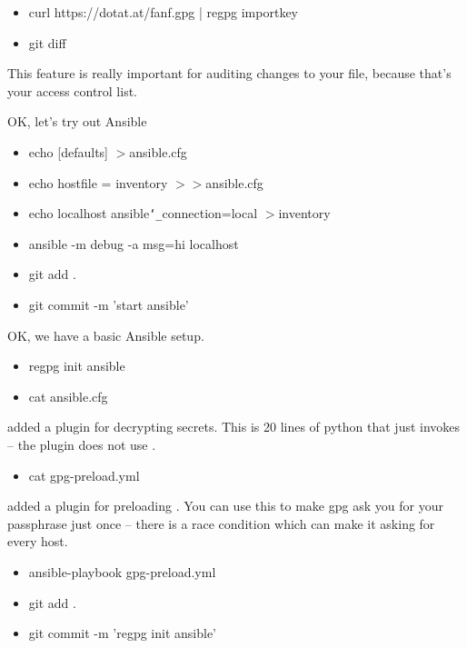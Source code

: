 {  \begin{itemize}
  \item curl https://dotat.at/fanf.gpg | regpg importkey
  \item git diff
  \end{itemize}

  This feature is really important for auditing changes to your
   file, because that's your access control list.

  OK, let's try out Ansible

  \begin{itemize}
  \item echo [defaults] $>$ansible.cfg
  \item echo hostfile = inventory $>>$ansible.cfg
  \item echo localhost ansible\texttt{\char`_}connection=local $>$inventory
  \item ansible -m debug -a msg=hi localhost
  \item git add .
  \item git commit -m 'start ansible'
  \end{itemize}

  OK, we have a basic Ansible setup.

  \begin{itemize}
  \item regpg init ansible
  \item cat ansible.cfg
  \end{itemize}

  \regpg added a plugin for decrypting secrets. This is 20 lines of
  python that just invokes  -- the plugin does not
  use \regpg.

  \begin{itemize}
  \item cat gpg-preload.yml
  \end{itemize}

  \regpg added a plugin for preloading . You can use
  this to make gpg ask you for your passphrase just once -- there is a
  race condition which can make it asking for every host.

  \begin{itemize}
  \item ansible-playbook gpg-preload.yml
  \end{itemize}

  \begin{itemize}
  \item git add .
  \item git commit -m 'regpg init ansible'
  \end{itemize}

}
